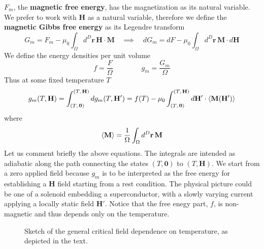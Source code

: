 $F_m$, the \textbf{magnetic free energy}, has the magnetization as its natural variable. We prefer to work with $\mathbf{H}$ as a natural variable, therefore we define the \textbf{magnetic Gibbs free energy} as its Legendre transform
\[
    G_m = F_m - \mu_0 \int_{\Omega} d^D \mathbf{r} \, \mathbf{H} \cdot \mathbf{M}
    \quad\implies\quad
    dG_m = dF - \mu_0 \int_{\Omega} d^D \mathbf{r} \, \mathbf{M} \cdot d\mathbf{H}
\]
We define the energy densities per unit volume
\[
    f = \frac{F}{\Omega}
    \qquad\qquad
    g_m = \frac{G_m}{\Omega}
\]
Thus at some fixed temperature $T$
\[
    g_m (T,\mathbf{H}) = \int_{(T,\,\mathbf{0})}^{(T,\,\mathbf{H})} dg_m (T,\mathbf{H}') = f(T) - \mu_0 \int_{(T,\,\mathbf{0})}^{(T,\,\mathbf{H})} d\mathbf{H}' \cdot \ev{\mathbf{M}(\mathbf{H}')}
\]
where
\[
    \ev{\mathbf{M}} = \frac{1}{\Omega} \int_\Omega d^D \mathbf{r} \, \mathbf{M}
\]
Let us comment briefly the above equations. The integrals are intended as adiabatic along the path connecting the states $(T,\mathbf{0})$ to $(T,\mathbf{H})$. We start from a zero applied field because $g_m$ is to be interpreted as the free energy for establishing a $\mathbf{H}$ field starting from a rest condition. The physical picture could be one of a solenoid embedding a superconductor, with a slowly varying current applying a locally static field $\mathbf{H}'$. Notice that the free enegy part, $f$, is non-magnetic and thus depends only on the temperature.

\begin{figure}
    \centering
    
    \caption{Sketch of the general critical field dependence on temperature, as depicted in the text.}
    \label{fig:critical region}
\end{figure}

